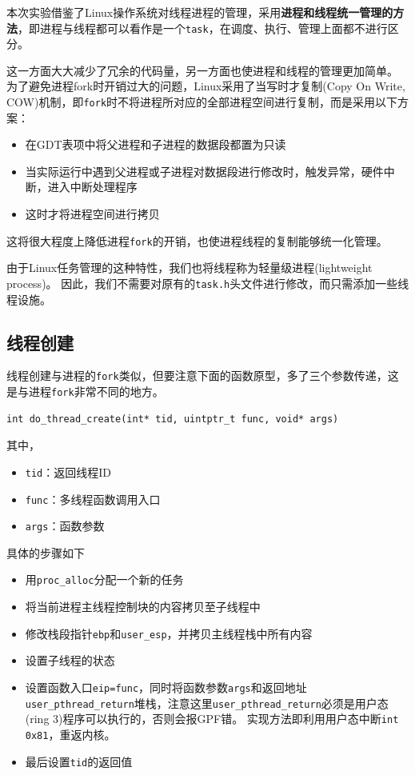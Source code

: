 \documentclass[logo,reportComp]{thesis}
\begin{document}
本次实验借鉴了Linux操作系统对线程进程的管理，采用\textbf{进程和线程统一管理的方法}，即进程与线程都可以看作是一个\verb'task'，在调度、执行、管理上面都不进行区分。

这一方面大大减少了冗余的代码量，另一方面也使进程和线程的管理更加简单。
为了避免进程fork时开销过大的问题，Linux采用了当写时才复制(Copy On Write, COW)机制，即\verb'fork'时不将进程所对应的全部进程空间进行复制，而是采用以下方案：
\begin{itemize}
	\item 在GDT表项中将父进程和子进程的数据段都置为只读
	\item 当实际运行中遇到父进程或子进程对数据段进行修改时，触发异常，硬件中断，进入中断处理程序
	\item 这时才将进程空间进行拷贝
\end{itemize}
这将很大程度上降低进程\verb'fork'的开销，也使进程线程的复制能够统一化管理。

由于Linux任务管理的这种特性，我们也将线程称为轻量级进程(lightweight process)。
因此，我们不需要对原有的\verb'task.h'头文件进行修改，而只需添加一些线程设施。

\subsection{线程创建}
线程创建与进程的\verb'fork'类似，但要注意下面的函数原型，多了三个参数传递，这是与进程\verb'fork'非常不同的地方。
\begin{lstlisting}
int do_thread_create(int* tid, uintptr_t func, void* args)
\end{lstlisting}
其中，
\begin{itemize}
	\item \verb'tid'：返回线程ID
	\item \verb'func'：多线程函数调用入口
	\item \verb'args'：函数参数
\end{itemize}

具体的步骤如下
\begin{itemize}
	\item 用\verb'proc_alloc'分配一个新的任务
	\item 将当前进程主线程控制块的内容拷贝至子线程中
	\item 修改栈段指针\verb'ebp'和\verb'user_esp'，并拷贝主线程栈中所有内容
	\item 设置子线程的状态
	\item 设置函数入口\verb'eip=func'，同时将函数参数\verb'args'和返回地址\verb'user_pthread_return'堆栈，注意这里\verb'user_pthread_return'必须是用户态(ring 3)程序可以执行的，否则会报GPF错。
	实现方法即利用用户态中断\verb'int 0x81'，重返内核。
	\item 最后设置\verb'tid'的返回值
\end{itemize}
\end{document}
